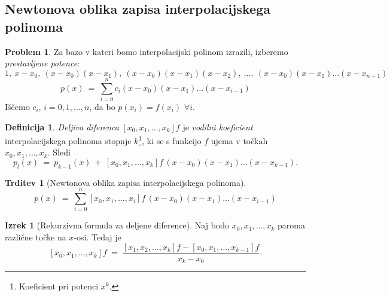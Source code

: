 \documentclass[11pt]{article}
\theoremstyle{definition}
\newtheorem{definicija}{Definicija}[section]
\theoremstyle{definition}
\newtheorem{problem}{Problem}[section]
\newtheorem{trditev}{Trditev}[section]
\newtheorem{izrek}{Izrek}
\begin{document}

\subsection{Newtonova oblika zapisa interpolacijskega polinoma}
\vspace{0.5cm}

\begin{problem}

Za bazo v kateri bomo interpolacijski polinom izrazili, izberemo \textit{prestavljene potence}:
$$1, ~x-x_0, ~(x-x_0)(x-x_1), ~(x-x_0)(x-x_1)(x-x_2), ~\ldots, ~(x-x_0)(x-x_1)\ldots(x-x_{n-1})$$
$$p(x) ~=~ \sum_{i=0}^n c_i (x-x_0)(x-x_1)\ldots(x-x_{i-1})$$
Iščemo $c_i$, $i = 0, 1, \ldots, n$, da bo $p(x_i) = f(x_i)$ $\forall i$.

\end{problem}
\vspace{0.5cm}

\begin{definicija}

\textit{Deljiva diferenca} $[x_0, x_1, \ldots, x_k]f$ je \textit{vodilni koeficient} interpolacijskega polinoma stopnje $k$\footnote{Koeficient pri potenci $x^k$.}, ki se s funkcijo $f$ ujema v točkah $x_0, x_1, \ldots, x_k$. Sledi
$$p_l(x) ~=~ p_{k-1}(x) ~+~ [x_0, x_1, \ldots, x_k]f \,(x-x_0)(x-x_1)\ldots(x-x_{k-1}).$$

\end{definicija}
\vspace{0.5cm}

\begin{trditev}[Newtonova oblika zapisa interpolacijskega polinoma]

$$p(x) ~=~ \sum_{i=0}^n [x_0, x_1, \ldots, x_i]f \,(x-x_0)(x-x_1)\ldots(x-x_{i-1})$$

\end{trditev}
\vspace{0.5cm}

\begin{izrek}[Rekurzivna formula za deljene diference]

Naj bodo $x_0, x_1, \ldots, x_k$ paroma različne točke na $x$-osi. Tedaj je
$$[x_0, x_1, \ldots, x_k]f ~=~ \frac{[x_1, x_2, \ldots, x_k]f - [x_0, x_1, \ldots, x_{k-1}]f}{x_k - x_0}.$$

\end{izrek}
\vspace{0.5cm}
\end{document}
